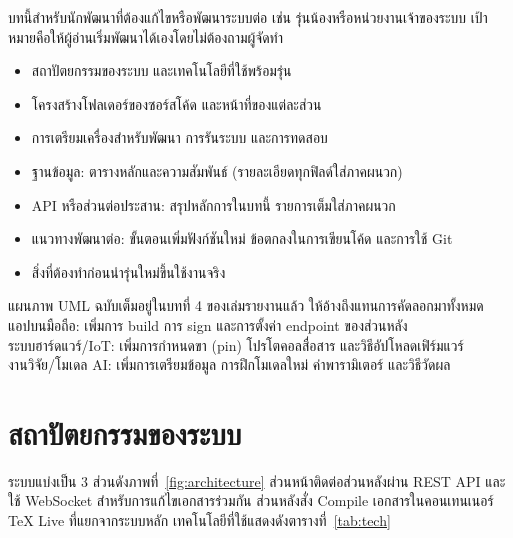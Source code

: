 \label{ch:dev}

\begin{guide}
บทนี้สำหรับนักพัฒนาที่ต้องแก้ไขหรือพัฒนาระบบต่อ เช่น รุ่นน้องหรือหน่วยงานเจ้าของระบบ
เป้าหมายคือให้ผู้อ่านเริ่มพัฒนาได้เองโดยไม่ต้องถามผู้จัดทำ
\begin{itemize}
  \item สถาปัตยกรรมของระบบ และเทคโนโลยีที่ใช้พร้อมรุ่น
  \item โครงสร้างโฟลเดอร์ของซอร์สโค้ด และหน้าที่ของแต่ละส่วน
  \item การเตรียมเครื่องสำหรับพัฒนา การรันระบบ และการทดสอบ
  \item ฐานข้อมูล: ตารางหลักและความสัมพันธ์ (รายละเอียดทุกฟิลด์ใส่ภาคผนวก)
  \item API หรือส่วนต่อประสาน: สรุปหลักการในบทนี้ รายการเต็มใส่ภาคผนวก
  \item แนวทางพัฒนาต่อ: ขั้นตอนเพิ่มฟังก์ชันใหม่ ข้อตกลงในการเขียนโค้ด และการใช้ Git
  \item สิ่งที่ต้องทำก่อนนำรุ่นใหม่ขึ้นใช้งานจริง
\end{itemize}
แผนภาพ UML ฉบับเต็มอยู่ในบทที่ 4 ของเล่มรายงานแล้ว ให้อ้างถึงแทนการคัดลอกมาทั้งหมด \\
แอปบนมือถือ: เพิ่มการ build การ sign และการตั้งค่า endpoint ของส่วนหลัง \\
ระบบฮาร์ดแวร์/IoT: เพิ่มการกำหนดขา (pin) โปรโตคอลสื่อสาร และวิธีอัปโหลดเฟิร์มแวร์ \\
งานวิจัย/โมเดล AI: เพิ่มการเตรียมข้อมูล การฝึกโมเดลใหม่ ค่าพารามิเตอร์ และวิธีวัดผล
\end{guide}

\section{สถาปัตยกรรมของระบบ}
\label{sec:architecture}

ระบบแบ่งเป็น 3 ส่วนดังภาพที่~\ref{fig:architecture} ส่วนหน้าติดต่อส่วนหลังผ่าน REST API
และใช้ WebSocket สำหรับการแก้ไขเอกสารร่วมกัน ส่วนหลังสั่ง Compile เอกสารในคอนเทนเนอร์ TeX Live
ที่แยกจากระบบหลัก เทคโนโลยีที่ใช้แสดงดังตารางที่~\ref{tab:tech}


